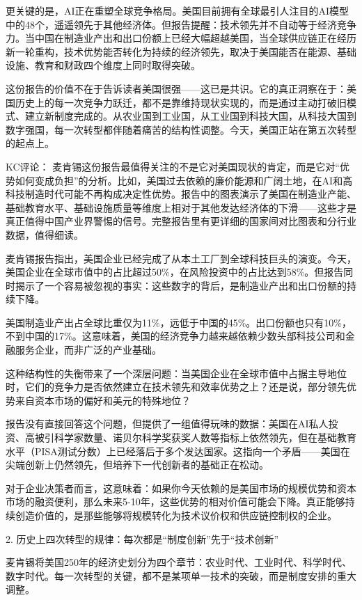 \documentclass[11pt]{ctexart}
\begin{document}
更关键的是，AI正在重塑全球竞争格局。美国目前拥有全球最引人注目的AI模型中的48个，遥遥领先于其他经济体。但报告提醒：技术领先并不自动等于经济竞争力。当中国在制造业产出和出口份额上已经大幅超越美国，当全球供应链正在经历新一轮重构，技术优势能否转化为持续的经济领先，取决于美国能否在能源、基础设施、教育和财政四个维度上同时取得突破。

这份报告的价值不在于告诉读者美国很强——这已是共识。它的真正洞察在于：美国历史上的每一次竞争力跃迁，都不是靠维持现状实现的，而是通过主动打破旧模式、建立新制度完成的。从农业国到工业国，从工业国到科技大国，从科技大国到数字强国，每一次转型都伴随着痛苦的结构性调整。今天，美国正站在第五次转型的起点上。

KC评论： 麦肯锡这份报告最值得关注的不是它对美国现状的肯定，而是它对“优势如何变成负担”的分析。比如，美国过去依赖的廉价能源和广阔土地，在AI和高科技制造时代可能不再构成决定性优势。报告中的图表演示了美国在制造业产能、基础教育水平、基础设施质量等维度上相对于其他发达经济体的下滑——这些才是真正值得中国产业界警惕的信号。完整报告里有更详细的国家间对比图表和分行业数据，值得细读。

麦肯锡报告指出，美国企业已经完成了从本土工厂到全球科技巨头的演变。今天，美国企业在全球市值中的占比超过50\%，在风险投资中的占比达到58\%。但报告同时揭示了一个容易被忽视的事实：这些数字的背后，是制造业产出和出口份额的持续下降。

美国制造业产出占全球比重仅为11\%，远低于中国的45\%。出口份额也只有10\%，不到中国的17\%。这意味着，美国的经济竞争力越来越依赖少数头部科技公司和金融服务企业，而非广泛的产业基础。

这种结构性的失衡带来了一个深层问题：当美国企业在全球市值中占据主导地位时，它们的竞争力是否依然建立在技术领先和效率优势之上？还是说，部分领先优势来自资本市场的偏好和美元的特殊地位？

报告没有直接回答这个问题，但提供了一组值得玩味的数据：美国在AI私人投资、高被引科学家数量、诺贝尔科学奖获奖人数等指标上依然领先，但在基础教育水平（PISA测试分数）上已经落后于多个发达国家。这指向一个矛盾——美国在尖端创新上仍然领先，但培养下一代创新者的基础正在松动。

对于企业决策者而言，这意味着：如果你今天依赖的是美国市场的规模优势和资本市场的融资便利，那么未来5-10年，这些优势的相对价值可能会下降。真正能够持续创造价值的，是那些能够将规模转化为技术议价权和供应链控制权的企业。

2. 历史上四次转型的规律：每次都是“制度创新”先于“技术创新”

麦肯锡将美国250年的经济史划分为四个章节：农业时代、工业时代、科学时代、数字时代。每一次转型的关键，都不是某项单一技术的突破，而是制度安排的重大调整。
\end{document}
